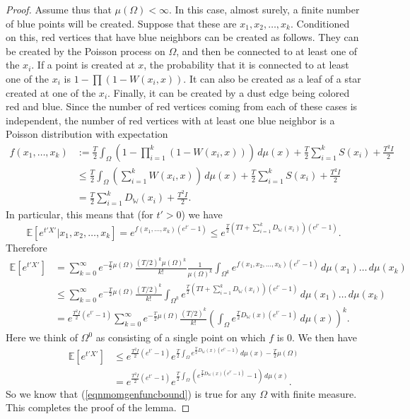 \documentclass{amsart}
\numberwithin{equation}{section}
\numberwithin{figure}{section}
\theoremstyle{definition}
\theoremstyle{remark}
\newcommand{\EE}{\mathbb{E}}
\newcommand{\cW}{\mathbb{W}}
\begin{document}
\begin{proof}
Assume thus that $\mu(\Omega)<\infty$. In this case, almost surely, a finite
number of blue points will be created. Suppose that these are
$x_1,x_2,\dots,x_k$. Conditioned on this, red vertices that have blue
neighbors can be created as follows. They can be created by the Poisson
process on $\Omega$, and then be connected to at least one of the $x_i$. If a
point is created at $x$, the probability that it is connected to at least one
of the $x_i$ is $1-\prod(1-W(x_i,x))$. It can also be created as a leaf of a
star created at one of the $x_i$. Finally, it can be created by a dust edge
being colored red and blue. Since the number of red vertices coming from each
of these cases is independent, the number of red vertices with at least one
blue neighbor is a Poisson distribution with expectation
\begin{align*}
f(x_1,\dots,x_k)&:=\frac T2 \int_{\Omega}\left(1-\prod_{i=1}^k (1-W(x_i,x))\right)\,d\mu(x)
+\frac T2\sum_{i=1}^k S(x_i)
+\frac {T^2 I}2
\\
&\le \frac T2\int_{\Omega} \left( \sum_{i=1}^k W(x_i,x)\right)\,d\mu(x)
+\frac T2\sum_{i=1}^kS(x_i)
+\frac {T^2 I}2\\
&=\frac T2 \sum_{i=1}^k D_\cW(x_i)
+\frac {T^2 I}2.
\end{align*}
In particular, this means that (for $t'>0$) we have
\[\EE[e^{t'X'}|x_1,x_2,\dots,x_k] = e^{f(x_1,\dots,x_k) (e^{t'}-1)}
\le e^{\frac T2\left(TI+\sum_{i=1}^k D_\cW(x_i)\right) (e^{t'}-1)}.
\]
Therefore
\begin{align*}\EE[e^{t'X'}]&=\sum_{k=0}^{\infty} e^{-\frac T2\mu(\Omega)} \frac{(T/2)^k\mu(\Omega)^k}{k!} \frac{1}{\mu(\Omega)^k} \int_{\Omega^k} e^{f(x_1,x_2,\dots,x_k)(e^{t'}-1)}\,d\mu(x_1)\dots\,d\mu(x_k) \\
&\le \sum_{k=0}^\infty e^{-\frac T2\mu(\Omega)}\frac{(T/2)^k}{k!} \int_{\Omega^k}e^{\frac T2\left(TI+\sum_{i=1}^k D_\cW(x_i) \right) (e^{t'}-1)} \,d\mu(x_1)\dots\,d\mu(x_k)\\
&= e^{\frac{T^2I}2 (e^{t'}-1)}\sum_{k=0}^\infty e^{-\frac T2\mu(\Omega)} \frac{(T/2)^k}{k!} \left( \int_\Omega e^{\frac T2D_\cW(x) (e^{t'}-1)}\,d\mu(x)\right)^k .
\end{align*}
Here we think of $\Omega^0$ as consisting of a single point on which $f$ is
$0$. We then have
\begin{align*}
\EE[e^{t'X'}] &\le e^{\frac{T^2I}2 (e^{t'}-1)}e^{\frac T2\int_\Omega e^{\frac T2 D_\cW(x)(e^{t'}-1)}\,d\mu(x)-\frac T2\mu(\Omega)}\\
&=e^{\frac{T^2I}2 (e^{t'}-1)}e^{\frac T2\int_\Omega \left(e^{\frac T2D_{\cW}(x)(e^{t'}-1) }-1\right)\, d\mu(x)}.
\end{align*}
So we know that (\ref{eqnmomgenfuncbound}) is true for any $\Omega$ with
finite measure. This completes the proof of the lemma.
\end{proof}
\end{document}
